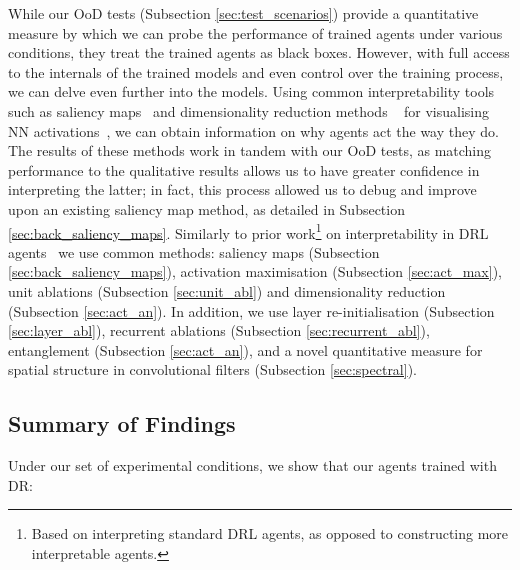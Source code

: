 While our OoD tests (Subsection \ref{sec:test_scenarios}) provide a quantitative measure by which we can probe the performance of trained agents under various conditions, they treat the trained agents as black boxes. However, with full access to the internals of the trained models and even control over the training process, we can delve even further into the models. Using common interpretability tools such as saliency maps~\cite{morch1995visualization, selvaraju2017grad, sundararajan2017axiomatic, zeiler2014visualizing}
and dimensionality reduction methods
~\cite{maaten2008visualizing, mcinnes2018umap, pearson1901liii} for
visualising NN activations~\cite{rauber2017visualizing}, we can obtain
information on why agents act the way they do. The results of these
methods work in tandem with our OoD tests, as matching performance to
the qualitative results allows us to have greater confidence in
interpreting the latter; in fact, this process allowed us to debug and
improve upon an existing saliency map method, as detailed in Subsection
\ref{sec:back_saliency_maps}.
{Similarly to prior work}\footnote{Based on interpreting
  standard DRL agents, as opposed to constructing more interpretable
  agents.} on interpretability in DRL agents~\cite{atrey2020exploratory, greydanus2018visualizing, jaunet2020drlviz, meyes2020you, olson2021counterfactual, puri2020explain, rupprecht2020finding, such2018atari, zahavy2016graying}
{we use common methods: saliency maps (Subsection \ref{sec:back_saliency_maps}), activation maximisation (Subsection \ref{sec:act_max}), unit ablations (Subsection \ref{sec:unit_abl}) and dimensionality reduction (Subsection \ref{sec:act_an}).}
In addition, we use layer re-initialisation (Subsection
\ref{sec:layer_abl}), recurrent ablations (Subsection
\ref{sec:recurrent_abl}), entanglement (Subsection \ref{sec:act_an}),
and a novel quantitative measure for spatial structure in convolutional
filters (Subsection \ref{sec:spectral}).


\hypertarget{summary-of-findings}{%
\subsection{Summary of Findings}\label{summary-of-findings}}

Under our set of experimental conditions, we show that our agents
trained with DR:


